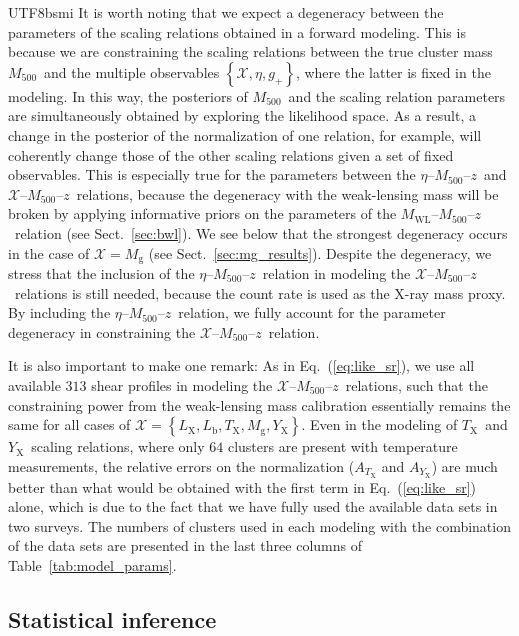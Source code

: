 \documentclass[longauth]{aa}
\newcommand{\Mfiveoo}{\ensuremath{M_{500}}}
\newcommand{\redshift}{\ensuremath{z}}
\newcommand{\gshear}{\ensuremath{g_{+}}}
\newcommand{\Mwl}{\ensuremath{M_{\mathrm{WL}}}}
\newcommand{\Xlabel}{\ensuremath{\mathcal{X}}}
\newcommand{\Lx}{\ensuremath{L_{\mathrm{X}}}}
\newcommand{\Lb}{\ensuremath{L_{\mathrm{b}}}}
\newcommand{\Tx}{\ensuremath{T_{\mathrm{X}}}}
\newcommand{\Yx}{\ensuremath{Y_{\mathrm{X}}}}
\newcommand{\Mg}{\ensuremath{M_{\mathrm{g}}}}
\newcommand{\rate}{\ensuremath{\eta}}
\begin{document}
\begin{CJK*}{UTF8}{bsmi}
It is worth noting that we expect a degeneracy between the parameters of the scaling relations obtained in a forward modeling.
This is because we are constraining the scaling relations between the
true cluster mass \Mfiveoo\ and the multiple observables $\left\lbrace\Xlabel, \rate, \gshear\right\rbrace$, where the latter is fixed in the modeling.
In this way, the posteriors of \Mfiveoo\ and the scaling relation parameters are simultaneously obtained by exploring the likelihood space. 
As a result, a change in the posterior of the normalization of one relation, for example,  will coherently change those of the other scaling relations given a set of fixed observables.
This is especially true for the parameters between the \rate--\Mfiveoo--\redshift\ and \Xlabel--\Mfiveoo--\redshift\ relations, because the degeneracy with the weak-lensing mass will be broken by applying informative priors on the parameters of the \Mwl--\Mfiveoo--\redshift\ relation (see Sect.~\ref{sec:bwl}).
We see below that the strongest degeneracy occurs in the case of $\Xlabel = \Mg$ (see Sect.~\ref{sec:mg_results}).
Despite the degeneracy, we stress that the inclusion of the \rate--\Mfiveoo--\redshift\ relation in modeling the \Xlabel--\Mfiveoo--\redshift\ relations is still needed, because the count rate is used as the X-ray mass proxy.
By including the \rate--\Mfiveoo--\redshift\ relation, we fully account for the parameter degeneracy in constraining the \Xlabel--\Mfiveoo--\redshift\ relation.



It is also important to make one remark:
As in Eq.~(\ref{eq:like_sr}), we use all available $313$ shear profiles in modeling the \Xlabel--\Mfiveoo--\redshift\ relations, such that the constraining power from the weak-lensing mass calibration essentially remains the same for all cases of $\Xlabel = \left\lbrace\Lx, \Lb, \Tx, \Mg, \Yx\right\rbrace$.
Even in the modeling of \Tx\ and \Yx\ scaling relations, where only $64$ clusters are present with temperature measurements, the relative errors on the normalization ($A_{\Tx}$ and $A_{\Yx}$) are much better than what would be obtained with the first term in
Eq.~(\ref{eq:like_sr}) alone, which is due to the fact that we have fully used the available data sets in two surveys.
The numbers of clusters used in each modeling with the combination of the data sets are presented in the last three columns of Table~\ref{tab:model_params}.



\subsection{Statistical inference}
\label{sec:mcmc}


\end{CJK*}
\end{document}
